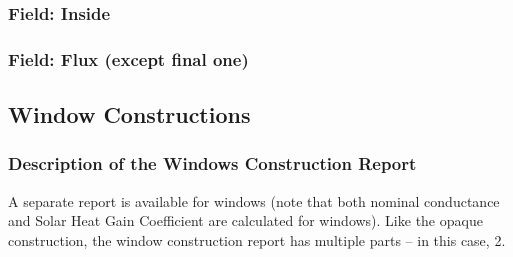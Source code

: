 \subsubsection{Field: Inside}\label{field-inside}

\subsubsection{Field: Flux (except final one)}\label{field-flux-except-final-one}

\subsection{Window Constructions}\label{window-constructions}

\subsubsection{Description of the Windows Construction Report}\label{description-of-the-windows-construction-report}

A separate report is available for windows (note that both nominal conductance and Solar Heat Gain Coefficient are calculated for windows). Like the opaque construction, the window construction report has multiple parts -- in this case, 2.

